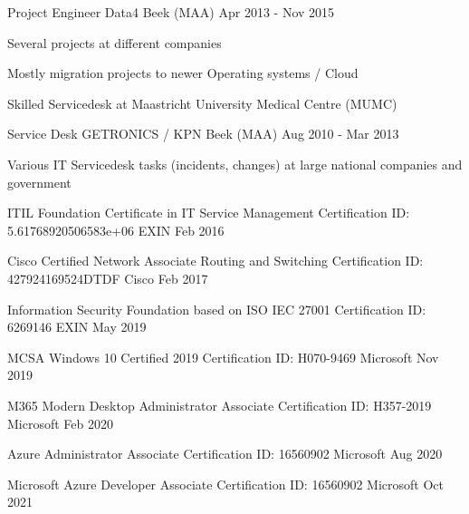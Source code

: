 \documentclass[11pt, letterpaper]{awesome-cv}
\begin{document}
\begin{cventries}
  \cventry
    {Project Engineer}
    {Data4}
    {Beek (MAA)}
    {Apr 2013 - Nov 2015}
    {
      \begin{cvitems}
        \item{Several projects at different companies}
        \item{Mostly migration projects to newer Operating systems / Cloud}
        \item{Skilled Servicedesk at Maastricht University Medical Centre (MUMC)}
      \end{cvitems}
    }


  \cventry
    {Service Desk}
    {GETRONICS / KPN}
    {Beek (MAA)}
    {Aug 2010 - Mar 2013}
    {
      \begin{cvitems}
        \item{Various IT Servicedesk tasks (incidents, changes) at large national companies and government}
      \end{cvitems}
    }



\end{cventries}

\begin{cvhonors}

  \cvhonor
    {ITIL Foundation Certificate in IT Service Management}
    {Certification ID: 5.61768920506583e+06}
    {EXIN}
    {Feb 2016}

  \cvhonor
    {Cisco Certified Network Associate Routing and Switching}
    {Certification ID: 427924169524DTDF}
    {Cisco}
    {Feb 2017}

  \cvhonor
    {Information Security Foundation based on ISO IEC 27001}
    {Certification ID: 6269146}
    {EXIN}
    {May 2019}

  \cvhonor
    {MCSA Windows 10 Certified 2019}
    {Certification ID: H070-9469}
    {Microsoft}
    {Nov 2019}

  \cvhonor
    {M365 Modern Desktop Administrator Associate}
    {Certification ID: H357-2019}
    {Microsoft}
    {Feb 2020}

  \cvhonor
    {Azure Administrator Associate}
    {Certification ID: 16560902}
    {Microsoft}
    {Aug 2020}

  \cvhonor
    {Microsoft Azure Developer Associate}
    {Certification ID: 16560902}
    {Microsoft}
    {Oct 2021}


\end{cvhonors}
\end{document}

